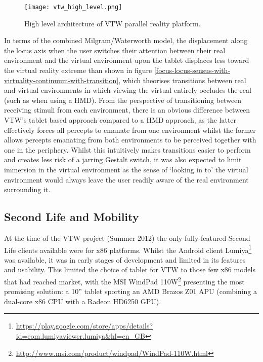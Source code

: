 \begin{figure}[h]
\centering
  \texttt{[image: vtw\_high\_level.png]}
  \caption{High level architecture of VTW parallel reality platform.}
  \label{vtw_high_level.png}
\end{figure}

In terms of the combined Milgram/Waterworth model, the displacement along the locus axis when the user switches their attention between their real environment and the virtual environment upon the tablet displaces less toward the virtual reality extreme than shown in figure \ref{focus-locus-sensus-with-virtuality-continuum-with-transition}, which theorises transitions between real and virtual environments in which viewing the virtual entirely occludes the real (such as when using a HMD). From the perspective of transitioning between receiving stimuli from each environment, there is an obvious difference between VTW's tablet based approach compared to a HMD approach, as the latter effectively forces all percepts to emanate from one environment whilst the former allows percepts emanating from both environments to be perceived together with one in the periphery. Whilst this intuitively makes transitions easier to perform and creates less risk of a jarring Gestalt switch, it was also expected to limit immersion in the virtual environment as the sense of `looking in to' the virtual environment would always leave the user readily aware of the real environment surrounding it.



\subsection{Second Life and Mobility}

\label{SecondLifeMobility}

\newcommand{\LumiyaFootnote}{\footnote{\url{https://play.google.com/store/apps/details?id=com.lumiyaviewer.lumiya&hl=en_GB}}}

\newcommand{\WindpadFootnote}{\footnote{\url{http://www.msi.com/product/windpad/WindPad-110W.html}}}


At the time of the VTW project (Summer 2012) the only fully-featured Second Life clients available were for x86 platforms. Whilst the Android client Lumiya\LumiyaFootnote{} was available, it was in early stages of development and limited in its features and usability. This limited the choice of tablet for VTW to those few x86 models that had reached market, with the MSI WindPad 110W\WindpadFootnote{} presenting the most promising solution: a 10'' tablet sporting an AMD Brazos Z01 APU (combining a dual-core x86 CPU with a Radeon HD6250 GPU).

